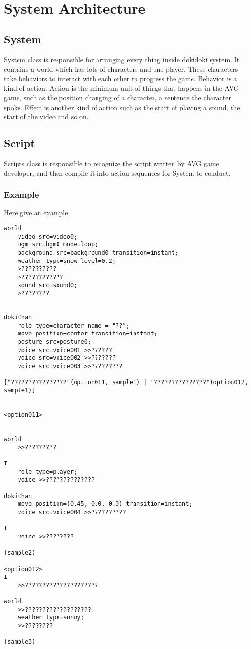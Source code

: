 \chapter{System Architecture}
\section{System}

System class is responsible for arranging every thing inside dokidoki system. It contains a world which has lots of characters and one player. These characters take behaviors to interact with each other to progress the game. Behavior is a kind of action. Action is the minimum unit of things that happens in the AVG game, such as the position changing of a character, a sentence the character spoke. Effect is another kind of action such as the start of playing a sound, the start of the video and so on.

\section{Script}

Scripts class is responsible to recognize the script written by AVG game developer, and then compile it into action sequences for System to conduct.

\subsection{Example}

Here give an example.

\begin{lstlisting}
world
	video src=video0;
	bgm src=bgm0 mode=loop;
	background src=background0 transition=instant;
	weather type=snow level=0.2;
	>??????????
	>????????????
	sound src=sound0;
	>????????


dokiChan
	role type=character name = "??"; 
	move position=center transition=instant; 
	posture src=posture0; 
	voice src=voice001 >>??????
	voice src=voice002 >>???????
	voice src=voice003 >>?????????

["????????????????"(option011, sample1) | "???????????????"(option012, sample1)] 


<option011>


world
	>>?????????

I
	role type=player;
	voice >>??????????????

dokiChan
	move position=(0.45, 0.0, 0.0) transition=instant; 
	voice src=voice004 >>??????????

I
	voice >>????????

(sample2)

<option012>
I
	>>????????????????????? 

world
	>>??????????????????? 
	weather type=sunny; 
	>>????????

(sample3)
\end{lstlisting}

